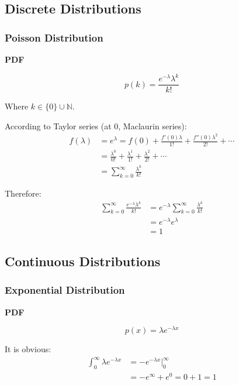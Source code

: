 \documentclass{article}
\begin{document}
\subsection{Discrete Distributions}
\subsubsection{Poisson Distribution}
\textbf{PDF}

\begin{equation}
p(k)=\frac{e^{-\lambda}\lambda^k}{k!}
\end{equation}

Where \(k \in \{0\} \cup \mathbb{N}\).

According to Taylor series (at 0, Maclaurin series):
\begin{equation}
\begin{split}
f(\lambda)&=e^{\lambda}=f(0)+\frac{f'(0)\lambda}{1!}+\frac{f''(0)\lambda^2}{2!}+\cdots\\
&=\frac{\lambda^0}{0!}+\frac{\lambda^1}{1!}+\frac{\lambda^2}{2!}+\cdots\\
&=\sum_{k=0}^\infty\frac{\lambda^k}{k!}
\end{split}
\end{equation}

Therefore:
\begin{equation}
\begin{split}
\sum_{k=0}^{\infty}\frac{e^{-\lambda}\lambda^k}{k!}&=e^{-\lambda}\sum_{k=0}^{\infty}\frac{\lambda^k}{k!}\\
&=e^{-\lambda}e^{\lambda}\\
&=1
\end{split}
\end{equation}

\subsection{Continuous Distributions}
\subsubsection{Exponential Distribution}
\textbf{PDF}

\begin{equation}
p(x)=\lambda e^{-\lambda x}
\end{equation}

It is obvious:
\begin{equation}
\begin{split}
\int_{0}^{\infty}\lambda e^{-\lambda x}&=-e^{-\lambda x}|^{\infty}_0\\
&=-e^{\infty}+e^0=0+1=1
\end{split}
\end{equation}
\end{document}
